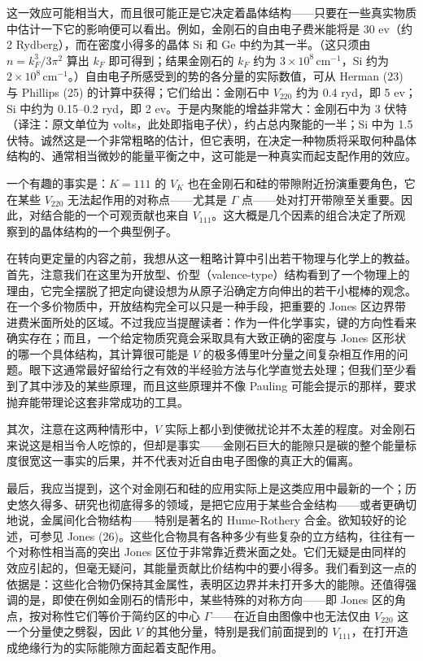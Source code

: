 这一效应可能相当大，而且很可能正是它决定着晶体结构——只要在一些真实物质中估计一下它的影响便可以看出。例如，金刚石的自由电子费米能将是 30 ev（约 2 Rydberg），而在密度小得多的晶体 Si 和 Ge 中约为其一半。（这只须由 $n=k_F^3/3\pi^2$ 算出 $k_F$ 即可得到；结果金刚石的 $k_F$ 约为 $3\times 10^{8}\,\mathrm{cm}^{-1}$，Si 约为 $2\times 10^{8}\, \mathrm{cm}^{-1}$。）自由电子所感受到的势的各分量的实际数值，可从 Herman (23) 与 Phillips (25) 的计算中获得；它们给出：金刚石中 $V_{220}$ 约为 0.4 ryd，即 5 ev；Si 中约为 0.15--0.2 ryd，即 2 ev。于是内聚能的增益非常大：金刚石中为 3 伏特（译注：原文单位为 volts，此处即指电子伏），约占总内聚能的一半；Si 中为 1.5 伏特。诚然这是一个非常粗略的估计，但它表明，在决定一种物质将采取何种晶体结构的、通常相当微妙的能量平衡之中，这可能是一种真实而起支配作用的效应。

一个有趣的事实是：$K=111$ 的 $V_K$ 也在金刚石和硅的带隙附近扮演重要角色，它在某些 $V_{220}$ 无法起作用的对称点——尤其是 $\Gamma$ 点——处对打开带隙至关重要。因此，对结合能的一个可观贡献也来自 $V_{111}$。这大概是几个因素的组合决定了所观察到的晶体结构的一个典型例子。

在转向更定量的内容之前，我想从这一粗略计算中引出若干物理与化学上的教益。首先，注意我们在这里为开放型、价型（valence-type）结构看到了一个物理上的理由，它完全摆脱了把定向键设想为从原子沿确定方向伸出的若干小棍棒的观念。在一个多价物质中，开放结构完全可以只是一种手段，把重要的 Jones 区边界带进费米面所处的区域。不过我应当提醒读者：作为一件化学事实，键的方向性看来确实存在；而且，一个给定物质究竟会采取具有大致正确的密度与 Jones 区形状的哪一个具体结构，其计算很可能是 $V$ 的极多傅里叶分量之间复杂相互作用的问题。眼下这通常最好留给行之有效的半经验方法与化学直觉去处理；但我们至少看到了其中涉及的某些原理，而且这些原理并不像 Pauling 可能会提示的那样，要求抛弃能带理论这套非常成功的工具。

其次，注意在这两种情形中，$V$ 实际上都小到使微扰论并不太差的程度。对金刚石来说这是相当令人吃惊的，但却是事实——金刚石巨大的能隙只是碳的整个能量标度很宽这一事实的后果，并不代表对近自由电子图像的真正大的偏离。

最后，我应当提到，这个对金刚石和硅的应用实际上是这类应用中最新的一个；历史悠久得多、研究也彻底得多的领域，是把它应用于某些合金结构——或者更确切地说，金属间化合物结构——特别是著名的 Hume-Rothery 合金。欲知较好的论述，可参见 Jones (26)。这些化合物具有各种多少有些复杂的立方结构，往往有一个对称性相当高的突出 Jones 区位于非常靠近费米面之处。它们无疑是由同样的效应引起的，但毫无疑问，其能量贡献比价结构中的要小得多。我们看到这一点的依据是：这些化合物仍保持其金属性，表明区边界并未打开多大的能隙。还值得强调的是，即使在例如金刚石的情形中，某些特殊的对称方向——即 Jones 区的角点，按对称性它们等价于简约区的中心 $\Gamma$——在近自由图像中也无法仅由 $V_{220}$ 这一个分量使之劈裂，因此 $V$ 的其他分量，特别是我们前面提到的 $V_{111}$，在打开造成绝缘行为的实际能隙方面起着支配作用。

